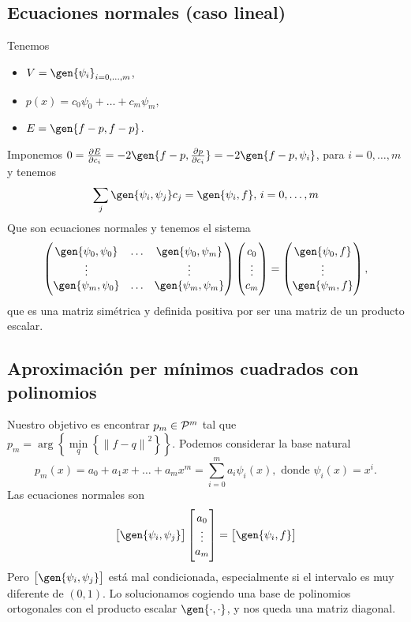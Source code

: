\subsection{Ecuaciones normales (caso lineal)}
Tenemos
\begin{itemize}
    \item $V = \gen{\psi_i}_{i=0,\dots, m}$,
    \item $p\left( x \right) = c_0\psi_0 + \dots + c_m\psi_m$,
    \item $E = \gen{f-p, f-p}$.
\end{itemize}
Imponemos $0 = \frac{\partial E}{\partial c_i} = -2 \gen{f-p, \frac{\partial p}{\partial c_i}} = -2 \gen{f-p, \psi_i}$, para $i = 0, \dots, m$ y tenemos
\[
    \sum_j \gen{\psi_i, \psi_j}c_j = \gen{\psi_i, f},\, i = 0,\dots, m
\]
Que son ecuaciones normales y tenemos el sistema
\[
    \begin{pmatrix}
        \gen{\psi_0, \psi_0} & \dots & \gen{\psi_0, \psi_m} \\
        \vdots & & \vdots \\
        \gen{\psi_m, \psi_0} & \dots & \gen{\psi_m, \psi_m}
    \end{pmatrix}
    \begin{pmatrix}
        c_0 \\
        \vdots \\
        c_m
    \end{pmatrix}
    =
    \begin{pmatrix}
        \gen{\psi_0, f} \\
        \vdots \\
        \gen{\psi_m, f}
    \end{pmatrix},
\]
que es una matriz simétrica y definida positiva por ser una matriz de un producto escalar.

\subsection{Aproximación per mínimos cuadrados con polinomios}
Nuestro objetivo es encontrar $p_m \in \mathcal{P}^m$ tal que $p_m = \arg\left\{ \min\limits_q \left\{ \left\|f-q\right\|^2 \right\} \right\}$. Podemos considerar la base natural
\[
    p_m(x) = a_0 + a_1x + \dots + a_mx^m = \sum_{i=0}^m a_i \psi_i(x), \text{ donde }\psi_i(x) = x^i.
\]
Las ecuaciones normales son
\[
    \left[ \gen{\psi_i, \psi_j} \right]
    \begin{bmatrix}
        a_0 \\
        \vdots \\
        a_m
    \end{bmatrix}
    = \left[ \gen{\psi_i, f} \right]
\]
Pero $\left[ \gen{\psi_i, \psi_j} \right]$ está mal condicionada, especialmente si el intervalo es muy diferente de $(0, 1)$. Lo solucionamos cogiendo una base de polinomios ortogonales con el producto escalar $\gen{\cdot, \cdot}$, y nos queda una matriz diagonal.
